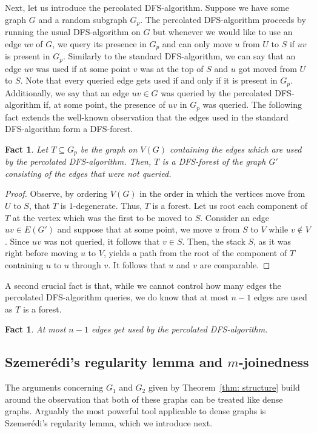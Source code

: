 \documentclass[10pt]{article}
\newtheorem{fact}[theorem]{Fact}
\theoremstyle{definition}
\begin{document}
    Next, let us introduce the percolated DFS-algorithm. Suppose we have some graph $G$ and a random subgraph $G_p$. The percolated DFS-algorithm proceeds by running the usual DFS-algorithm on $G$ but whenever we would like to use an edge $uv$ of $G$, we query its presence in $G_p$ and can only move $u$ from $U$ to $S$ if $uv$ is present in $G_p$. Similarly to the standard DFS-algorithm, we can say that an edge $uv$ was used if at some point $v$ was at the top of $S$ and $u$ got moved from $U$ to $S$. Note that every queried edge gets used if and only if it is present in $G_p$. Additionally, we say that an edge $uv\in G$ was queried by the percolated DFS-algorithm if, at some point, the presence of $uv$ in $G_p$ was queried.
    The following fact extends the well-known observation that the edges used in the standard DFS-algorithm form a DFS-forest.
    \begin{fact}\label{fact: DFS-forest}
        Let $T\subseteq G_p$ be the graph on $V(G)$ containing the edges which are used by the percolated DFS-algorithm. Then, $T$ is a DFS-forest of the graph $G'$ consisting of the edges that were not queried.
    \end{fact}
    \begin{proof}
        Observe, by ordering $V(G)$ in the order in which the vertices move from $U$ to $S$, that $T$ is $1$-degenerate. Thus, $T$ is a forest. Let us root each component of $T$ at the vertex which was the first to be moved to $S$. Consider an edge $uv\in E(G')$ and suppose that at some point, we move $u$ from $S$ to $V$ while $v\notin V$. Since $uv$ was not queried, it follows that $v\in S$. Then, the stack $S$, as it was right before moving $u$ to $V$, yields a path from the root of the component of $T$ containing $u$ to $u$ through $v$. It follows that $u$ and $v$ are comparable.
    \end{proof}
    A second crucial fact is that, while we cannot control how many edges the percolated DFS-algorithm queries, we do know that at most $n-1$ edges are used as $T$ is a forest.
    \begin{fact}\label{fact: DFS edges revealed}
        At most $n-1$ edges get used by the percolated DFS-algorithm.
    \end{fact}



\subsection{Szemer\'edi's regularity lemma and $m$-joinedness}
The arguments concerning $G_1$ and $G_2$ given by Theorem~\ref{thm: structure} build around the observation that both of these graphs can be treated like dense graphs. Arguably the most powerful tool applicable to dense graphs is Szemer\'edi's regularity lemma, which we introduce next.
\end{document}
